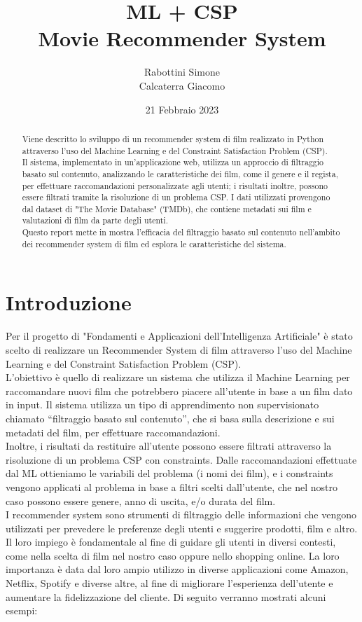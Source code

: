 \documentclass{report}
\title{\textbf{ML + CSP} \\ Movie Recommender System}
\author{Rabottini Simone \\ Calcaterra Giacomo}
\date{21 Febbraio 2023}
\begin{document}
\maketitle

\begin{abstract}
    Viene descritto lo sviluppo di un recommender system di film realizzato in Python attraverso l'uso del Machine Learning e del Constraint Satisfaction Problem (CSP). \\
    Il sistema, implementato in un'applicazione web, utilizza un approccio di filtraggio basato sul contenuto, analizzando le caratteristiche dei film, come il genere e il regista, per effettuare raccomandazioni personalizzate agli utenti; i risultati inoltre, possono essere filtrati tramite la risoluzione di un problema CSP. I dati utilizzati provengono dal dataset di "The Movie Database" (TMDb), che contiene metadati sui film e valutazioni di film da parte degli utenti. \\ 
    Questo report mette in mostra l'efficacia del filtraggio basato sul contenuto nell'ambito dei recommender system di film ed esplora le caratteristiche del sistema.
\end{abstract}

\tableofcontents

\newpage
\chapter{Introduzione}
    Per il progetto di "Fondamenti e Applicazioni dell'Intelligenza Artificiale" è stato scelto di realizzare un Recommender System di film attraverso l'uso del Machine Learning e del Constraint Satisfaction Problem (CSP). \\
    L'obiettivo è quello di realizzare un sistema che utilizza il Machine Learning per raccomandare nuovi film che potrebbero piacere all'utente in base a un film dato in input. Il sistema utilizza un tipo di apprendimento non supervisionato chiamato “filtraggio basato sul contenuto”, che si basa sulla descrizione e sui metadati del film, per effettuare raccomandazioni. \\
    Inoltre, i risultati da restituire all'utente possono essere filtrati  attraverso la risoluzione di un problema CSP con constraints. Dalle raccomandazioni effettuate dal ML ottieniamo le variabili del problema (i nomi dei film), e i constraints vengono applicati al problema in base a filtri scelti dall'utente, che nel nostro caso possono essere genere, anno di uscita, e/o durata del film. \\
    I recommender system sono strumenti di filtraggio delle informazioni che vengono utilizzati per prevedere le preferenze degli utenti e suggerire prodotti, film e altro. Il loro impiego è fondamentale al fine di guidare gli utenti in diversi contesti, come nella scelta di film nel nostro caso oppure nello shopping online. La loro importanza è data dal loro ampio utilizzo in diverse applicazioni come Amazon, Netflix, Spotify e diverse altre, al fine di migliorare l'esperienza dell'utente e aumentare la fidelizzazione del cliente. Di seguito verranno mostrati alcuni esempi:
    
\end{document}
